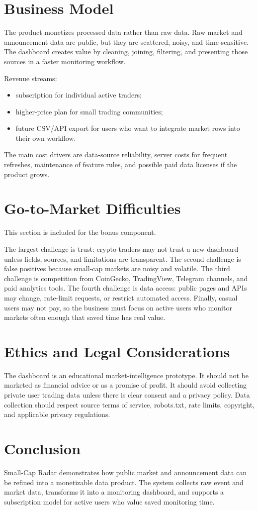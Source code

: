 \documentclass[11pt]{article}
\newcommand{\product}{Small-Cap Radar}
\begin{document}
\section{Business Model}

The product monetizes processed data rather than raw data. Raw market and announcement data are public, but they are scattered, noisy, and time-sensitive. The dashboard creates value by cleaning, joining, filtering, and presenting those sources in a faster monitoring workflow.

Revenue streams:
\begin{itemize}
  \item subscription for individual active traders;
  \item higher-price plan for small trading communities;
  \item future CSV/API export for users who want to integrate market rows into their own workflow.
\end{itemize}

The main cost drivers are data-source reliability, server costs for frequent refreshes, maintenance of feature rules, and possible paid data licenses if the product grows.

\section{Go-to-Market Difficulties}

This section is included for the bonus component.

The largest challenge is trust: crypto traders may not trust a new dashboard unless fields, sources, and limitations are transparent. The second challenge is false positives because small-cap markets are noisy and volatile. The third challenge is competition from CoinGecko, TradingView, Telegram channels, and paid analytics tools. The fourth challenge is data access: public pages and APIs may change, rate-limit requests, or restrict automated access. Finally, casual users may not pay, so the business must focus on active users who monitor markets often enough that saved time has real value.

\section{Ethics and Legal Considerations}

The dashboard is an educational market-intelligence prototype. It should not be marketed as financial advice or as a promise of profit. It should avoid collecting private user trading data unless there is clear consent and a privacy policy. Data collection should respect source terms of service, robots.txt, rate limits, copyright, and applicable privacy regulations.

\section{Conclusion}

\product{} demonstrates how public market and announcement data can be refined into a monetizable data product. The system collects raw event and market data, transforms it into a monitoring dashboard, and supports a subscription model for active users who value saved monitoring time.
\end{document}
